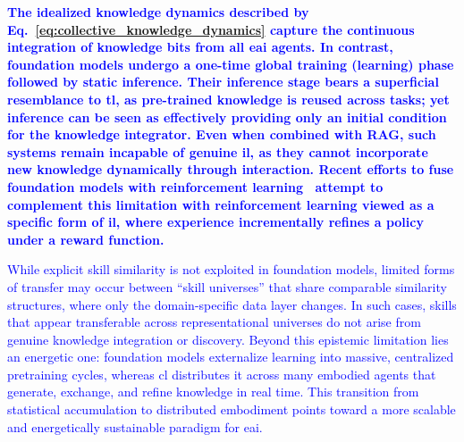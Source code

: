 \documentclass[12pt]{article}
\newcommand\myhl[1]{\textcolor{blue}{#1}}
\renewcommand{\emph}[1]{\textit{#1}}
\begin{document}
\myhl{\textbf{The idealized knowledge dynamics described by Eq.~\eqref{eq:collective_knowledge_dynamics} capture the continuous integration of knowledge bits from all \ac{eai} agents. In contrast, foundation models undergo a one-time global training (learning) phase followed by static inference. Their inference stage bears a superficial resemblance to \ac{tl}, as pre-trained knowledge is reused across tasks; yet inference can be seen as effectively providing only an initial condition for the knowledge integrator. Even when combined with RAG, such systems remain incapable of genuine \ac{il}, as they cannot incorporate new knowledge dynamically through interaction. Recent efforts to fuse foundation models with reinforcement learning~\cite{firoozi2025foundation} attempt to complement this limitation with reinforcement learning viewed as a specific form of \ac{il}, where experience incrementally refines a policy under a reward function.}}

\myhl{While explicit skill similarity is not exploited in foundation models, limited forms of transfer may occur between ``skill universes'' that share comparable similarity structures, where only the domain-specific data layer changes. In such cases, skills that appear transferable across representational universes do not arise from genuine knowledge integration or discovery. Beyond this epistemic limitation lies an energetic one: foundation models externalize learning into massive, centralized pretraining cycles, whereas \ac{cl} distributes it across many embodied agents that generate, exchange, and refine knowledge in real time. This transition from statistical accumulation to distributed embodiment points toward a more scalable and energetically sustainable paradigm for \ac{eai}.}
\end{document}
